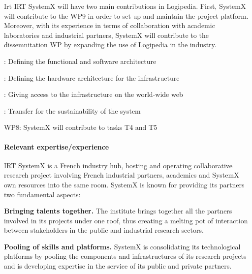 \begin{sitedescription}{Irt}
IRT SystemX will have two main contributions in Logipedia. First, SystemX will contribute to the WP9 in order to set up and maintain the project platform. Moreover, with its experience in terms of collaboration with academic laboratories and industrial partners, SystemX will contribute to the dissemnitation WP by expanding the use of Logipedia in the industry.






\begin{compactitem}
\item {} : Defining the functional and software architecture
\item {} : Defining the hardware architecture for the infrastructure
\item {} : Giving access to the infrastructure on the world-wide web
\item {} : Transfer for the sustainability of the system
\item WP8: SystemX will contribute to tasks T4 and T5
\end{compactitem}




\paragraph*{Relevant expertise/experience}

IRT SystemX is a French industry hub, hosting and operating collaborative research project involving French industrial partners, academics and SystemX own resources into the same room. SystemX is known for providing its partners two fundamental aspects:

\begin{compactitem}
\item {\bf Bringing talents together.} The institute brings together all the partners involved in its projects under one roof, thus creating a melting pot of interaction between stakeholders in the public and industrial research sectors.
\item {\bf Pooling of skills and platforms.} SystemX is consolidating its technological platforms by pooling the components and infrastructures of its research projects and is developing expertise in the service of its public and private partners.
\end{compactitem}





\end{sitedescription}
